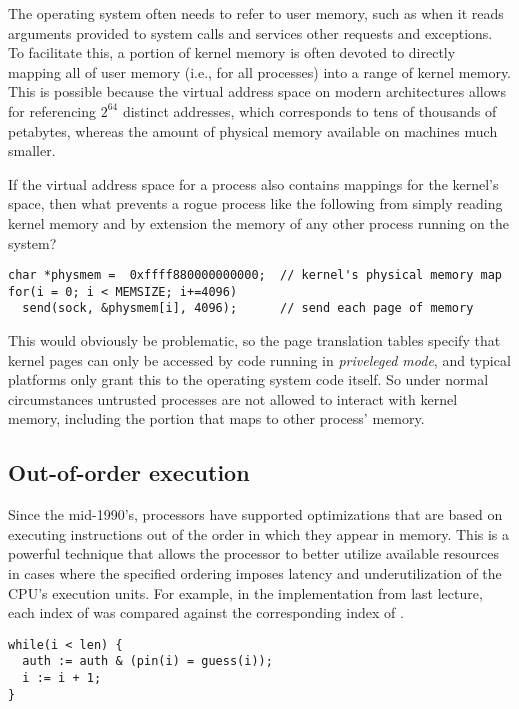 \documentclass[11pt,twoside]{scrartcl}
\begin{document}
The operating system often needs to refer to user memory, such as when it reads arguments provided to system calls and services other requests and exceptions. To facilitate this, a portion of kernel memory is often devoted to directly mapping all of user memory (i.e., for all processes) into a range of kernel memory. This is possible because the virtual address space on modern architectures allows for referencing $2^{64}$ distinct addresses, which corresponds to tens of thousands of petabytes, whereas the amount of physical memory available on machines much smaller. 

If the virtual address space for a process also contains mappings for the kernel's space, then what prevents a rogue process like the following  from simply reading kernel memory and by extension the memory of any other process running on the system?

\lstset{language=C}
\begin{lstlisting}
char *physmem =  0xffff880000000000;  // kernel's physical memory map
for(i = 0; i < MEMSIZE; i+=4096)
  send(sock, &physmem[i], 4096);      // send each page of memory
\end{lstlisting}

This would obviously be problematic, so the page translation tables specify that kernel pages can only be accessed by code running in \emph{priveleged mode}, and typical platforms only grant this to the operating system code itself. So under normal circumstances untrusted processes are not allowed to interact with kernel memory, including the portion that maps to other process' memory.

\subsection{Out-of-order execution}

Since the mid-1990's, processors have supported optimizations that are based on executing instructions out of the order in which they appear in memory. This is a powerful technique that allows the processor to better utilize available resources in cases where the specified ordering imposes latency and underutilization of the CPU's execution units. For example, in the  implementation from last lecture, each index of  was compared against the corresponding index of .

\lstset{language=C}
\begin{lstlisting}
while(i < len) {
  auth := auth & (pin(i) = guess(i));
  i := i + 1;
}
\end{lstlisting}
\end{document}

